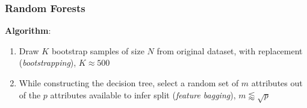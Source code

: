   \subsubsection{Random Forests} %
  \label{ssub:random_forests}
    \textbf{Algorithm}:
    \begin{enumerate}
      \item Draw $K$ bootstrap samples of size $N$ from original dataset, with replacement (\emph{bootstrapping}), $K\approx 500$
      \item While constructing the decision tree, select a random set of $m$ attributes out of the $p$ attributes available to infer split (\emph{feature bagging}), $m\lessapprox\sqrt{p}$
    \end{enumerate}

